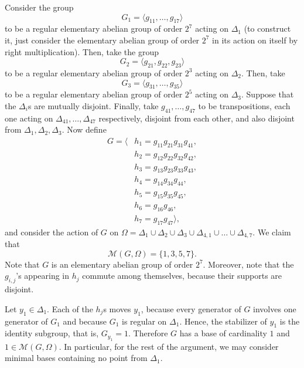 \documentclass{amsart}
\begin{document}
	Consider the group $$G_1 = \langle g_{11},\dots, g_{17}\rangle$$ to be a regular elementary abelian group of order $2^7$ acting on $\Delta_1$ (to construct it, just consider the elementary abelian group of order $2^7$ in its action on itself by right multiplication). Then, take the group $$ G_2 = \langle g_{21},g_{22},g_{23} \rangle $$ to be a regular elementary abelian group of order $2^3$ acting on $\Delta_2$. Then, take $$ G_3 = \langle g_{31},\dots, g_{35} \rangle $$ to be a regular elementary abelian group of order $2^5$ acting on $\Delta_3$. Suppose that the $\Delta_i$s are mutually disjoint. Finally, take $g_{41},\dots,g_{47}$ to be transpositions, each one acting on $\Delta_{41},\dots,\Delta_{47}$ respectively, disjoint from each other, and also disjoint from $\Delta_1, \Delta_2, \Delta_3$.
	Now define 
	\begin{align*}
		G = \langle 
		&h_1=g_{11}g_{21}g_{31}g_{41}, \\ 			&h_2=g_{12}g_{22}g_{32}g_{42}, \\ 
		&h_3=g_{13}g_{23}g_{33}g_{43}, \\
		&h_4=g_{14}g_{34}g_{44}, \\
		&h_5=g_{15}g_{35}g_{45}, \\
		&h_6=g_{16}g_{46},\\
		&h_7=g_{17}g_{47} 
		\rangle,
	\end{align*}
	and consider the action of $G$ on $\Omega=\Delta_1 \cup \Delta_2 \cup \Delta_3 \cup \Delta_{4,1} \cup \dots \cup \Delta_{4,7}$. We claim that
	$$\mathcal{M}(G,\Omega)=\{1,3,5,7\}.$$ Note that $G$ is an elementary abelian group of order $2^7$. Moreover, note that the $g_{i,j}$'s appearing in $h_j$ commute among themselves, because their supports are disjoint. 
	
	Let $y_1 \in \Delta_1$. Each of the $h_j$s moves $y_1$, because every generator of $G$ involves one generator of $G_1$ and because $G_1$ is regular on $\Delta_1$. Hence, the stabilizer of $y_1$ is the identity subgroup, that is, $G_{y_1}=1$. Therefore $G$ has a base of cardinality $1$ and $1\in\mathcal{M}(G,\Omega)$. In particular, for the rest of the argument, we may consider minimal bases containing no point from $\Delta_1$.
	
\end{document}
